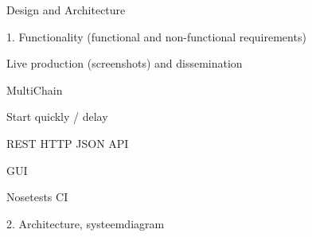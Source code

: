 Design and Architecture


1. Functionality (functional and non-functional requirements)

Live production (screenshots) and dissemination

MultiChain

Start quickly / delay

REST HTTP JSON API

GUI

Nosetests CI


2. Architecture, systeemdiagram


